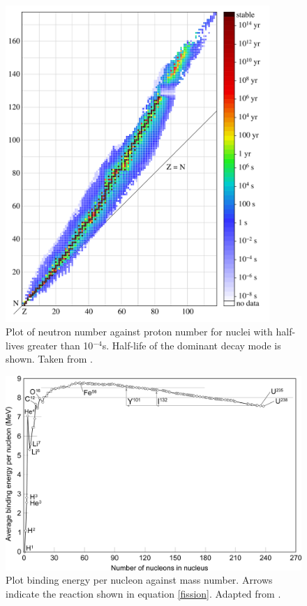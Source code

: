 


\begin{figure}[htp]
\centering
\includegraphics[height=12cm]{images/Isotopes_and_half-life.png}
\caption[Plot of neutron number against proton number for nuclei with half-lives greater than 10${^{-4}}$s. Half-life of the dominant decay mode is shown.]{Plot of neutron number against proton number for nuclei with half-lives greater than 10${^{-4}}$s. Half-life of the dominant decay mode is shown. Taken from \cite{BenRG}.}
\label{figure:NZcurve}
\end{figure}

\begin{figure}[htp]
\centering
\includegraphics[width=14cm]{images/Binding_energy_curve.png}
\caption[Plot binding energy per nucleon against mass number. Arrows indicate the reaction shown in equation \ref{fission}.]{Plot binding energy per nucleon against mass number. Arrows indicate the reaction shown in equation \ref{fission}. Adapted from \cite{Fastfission}.}
\label{figure:bindingenergy}
\end{figure}


